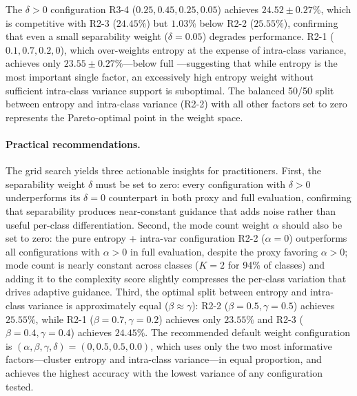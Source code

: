The $\delta > 0$ configuration R3-4 ($0.25, 0.45, 0.25, 0.05$) achieves $24.52 \pm 0.27\%$, which is competitive with R2-3 ($24.45\%$) but $1.03\%$ below R2-2 ($25.55\%$), confirming that even a small separability weight ($\delta{=}0.05$) degrades performance. R2-1 ($0.1, 0.7, 0.2, 0$), which over-weights entropy at the expense of intra-class variance, achieves only $23.55 \pm 0.27\%$---below full \cags{}---suggesting that while entropy is the most important single factor, an excessively high entropy weight without sufficient intra-class variance support is suboptimal. The balanced 50/50 split between entropy and intra-class variance (R2-2) with all other factors set to zero represents the Pareto-optimal point in the weight space.

\paragraph{Practical recommendations.}
The grid search yields three actionable insights for practitioners. First, the separability weight $\delta$ must be set to zero: every configuration with $\delta > 0$ underperforms its $\delta = 0$ counterpart in both proxy and full evaluation, confirming that separability produces near-constant guidance that adds noise rather than useful per-class differentiation. Second, the mode count weight $\alpha$ should also be set to zero: the pure entropy + intra-var configuration R2-2 ($\alpha{=}0$) outperforms all configurations with $\alpha > 0$ in full evaluation, despite the proxy favoring $\alpha > 0$; mode count is nearly constant across classes ($K{=}2$ for 94\% of classes) and adding it to the complexity score slightly compresses the per-class variation that drives adaptive guidance. Third, the optimal split between entropy and intra-class variance is approximately equal ($\beta \approx \gamma$): R2-2 ($\beta{=}0.5, \gamma{=}0.5$) achieves $25.55\%$, while R2-1 ($\beta{=}0.7, \gamma{=}0.2$) achieves only $23.55\%$ and R2-3 ($\beta{=}0.4, \gamma{=}0.4$) achieves $24.45\%$. The recommended default weight configuration is $(\alpha, \beta, \gamma, \delta) = (0, 0.5, 0.5, 0.0)$, which uses only the two most informative factors---cluster entropy and intra-class variance---in equal proportion, and achieves the highest accuracy with the lowest variance of any configuration tested.
